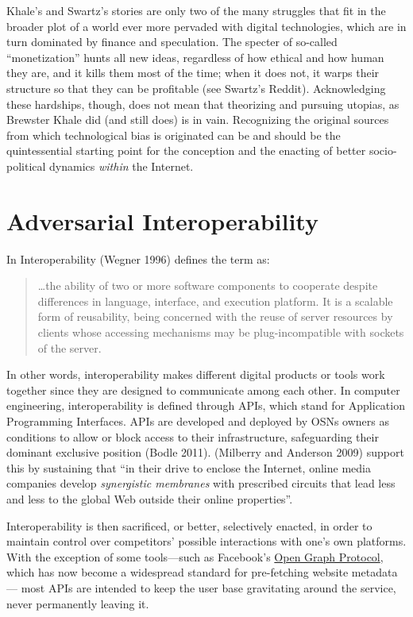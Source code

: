 \documentclass[
  a4paper,
]{book}
\begin{document}
Khale's and Swartz's stories are only two of the many struggles that fit in the broader plot of a world ever more pervaded with digital technologies, which are in turn dominated by finance and speculation. The specter of so-called ``monetization'' hunts all new ideas, regardless of how ethical and how human they are, and it kills them most of the time; when it does not, it warps their structure so that they can be profitable (see Swartz's Reddit). Acknowledging these hardships, though, does not mean that theorizing and pursuing utopias, as Brewster Khale did (and still does) is in vain. Recognizing the original sources from which technological bias is originated can be and should be the quintessential starting point for the conception and the enacting of better socio-political dynamics \emph{within} the Internet.

\hypertarget{adversarial-interoperability}{%
\section{Adversarial Interoperability}\label{adversarial-interoperability}}

In Interoperability {(Wegner 1996)} defines the term as:

\begin{quote}
\ldots the ability of two or more software components to cooperate despite differences in language, interface, and execution platform. It is a scalable form of reusability, being concerned with the reuse of server resources by clients whose accessing mechanisms may be plug-incompatible with sockets of the server.
\end{quote}

In other words, interoperability makes different digital products or tools work together since they are designed to communicate among each other. In computer engineering, interoperability is defined through APIs, which stand for Application Programming Interfaces. APIs are developed and deployed by OSNs owners as conditions to allow or block access to their infrastructure, safeguarding their dominant exclusive position {(Bodle 2011)}. {(Milberry and Anderson 2009)} support this by sustaining that ``in their drive to enclose the Internet, online media companies develop \emph{synergistic membranes} with prescribed circuits that lead less and less to the global Web outside their online properties''.

Interoperability is then sacrificed, or better, selectively enacted, in order to maintain control over competitors' possible interactions with one's own platforms. With the exception of some tools---such as Facebook's \href{https://ogp.me}{Open Graph Protocol}, which has now become a widespread standard for pre-fetching website metadata--- most APIs are intended to keep the user base gravitating around the service, never permanently leaving it.
\end{document}
